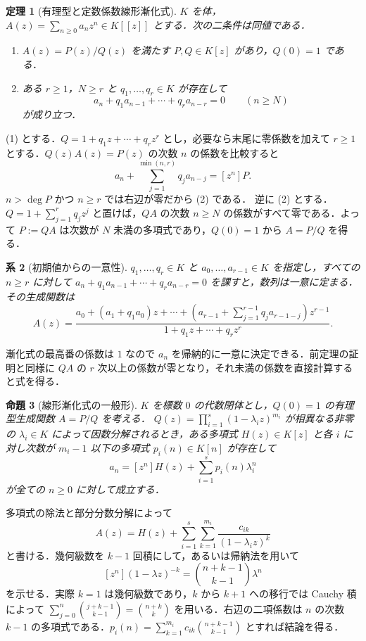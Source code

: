 \documentclass[a5paper,10pt,onecolumn]{jsarticle}
\makeatletter
\theoremstyle{mathnotetheorem}
\newtheorem{theorem}{定理}[section]
\newtheorem{proposition}[theorem]{命題}
\newtheorem{corollary}[theorem]{系}
\renewcommand{\proofname}{証明}
\renewenvironment{proof}[1][\proofname]{%
  \par\pushQED{\qed}\normalfont\topsep4\p@\@plus2\p@\relax
  \trivlist\item[\hskip\labelsep\bfseries #1]\ignorespaces
}{\popQED\endtrivlist\@endpefalse}
\makeatother
\begin{document}
\begin{theorem}[有理型と定数係数線形漸化式]\label{thm:rational}
$K$ を体，$A(z)=\sum_{n\ge0}a_nz^n\in K[[z]]$ とする．次の二条件は同値である．
\begin{enumerate}
\item $A(z)=P(z)/Q(z)$ を満たす $P,Q\in K[z]$ があり，$Q(0)=1$ である．
\item ある $r\ge1$，$N\ge r$ と $q_1,\dots,q_r\in K$ が存在して
\[
 a_n+q_1a_{n-1}+\cdots+q_ra_{n-r}=0\qquad(n\ge N)
\]
が成り立つ．
\end{enumerate}
\end{theorem}
\begin{proof}
(1) とする．$Q=1+q_1z+\cdots+q_rz^r$ とし，必要なら末尾に零係数を加えて $r\ge1$ とする．$Q(z)A(z)=P(z)$ の次数 $n$ の係数を比較すると
\[
 a_n+\sum_{j=1}^{\min(n,r)}q_ja_{n-j}=[z^n]P.
\]
$n>\deg P$ かつ $n\ge r$ では右辺が零だから (2) である．
逆に (2) とする．$Q=1+\sum_{j=1}^r q_jz^j$ と置けば，$QA$ の次数 $n\ge N$ の係数がすべて零である．よって $P:=QA$ は次数が $N$ 未満の多項式であり，$Q(0)=1$ から $A=P/Q$ を得る．
\end{proof}

\begin{corollary}[初期値からの一意性]
$q_1,\dots,q_r\in K$ と $a_0,\dots,a_{r-1}\in K$ を指定し，すべての $n\ge r$ に対して
$a_n+q_1a_{n-1}+\cdots+q_ra_{n-r}=0$ を課すと，数列は一意に定まる．その生成関数は
\[
 A(z)=\frac{a_0+(a_1+q_1a_0)z+\cdots+
 (a_{r-1}+\sum_{j=1}^{r-1}q_ja_{r-1-j})z^{r-1}}
 {1+q_1z+\cdots+q_rz^r}.
\]
\end{corollary}
\begin{proof}
漸化式の最高番の係数は $1$ なので $a_n$ を帰納的に一意に決定できる．前定理の証明と同様に $QA$ の $r$ 次以上の係数が零となり，それ未満の係数を直接計算すると式を得る．
\end{proof}

\begin{proposition}[線形漸化式の一般形]\label{prop:partial}
$K$ を標数 $0$ の代数閉体とし，$Q(0)=1$ の有理型生成関数 $A=P/Q$ を考える．
$Q(z)=\prod_{i=1}^{s}(1-\lambda_i z)^{m_i}$ が相異なる非零の $\lambda_i\in K$ によって因数分解されるとき，ある多項式 $H(z)\in K[z]$ と各 $i$ に対し次数が $m_i-1$ 以下の多項式 $p_i(n)\in K[n]$ が存在して
\[
 a_n=[z^n]H(z)+\sum_{i=1}^s p_i(n)\lambda_i^n
\]
が全ての $n\ge0$ に対して成立する．
\end{proposition}
\begin{proof}
多項式の除法と部分分数分解によって
\[
 A(z)=H(z)+\sum_{i=1}^s\sum_{k=1}^{m_i}
 \frac{c_{ik}}{(1-\lambda_i z)^k}
\]
と書ける．幾何級数を $k-1$ 回積にして，あるいは帰納法を用いて
\[
 [z^n](1-\lambda z)^{-k}=
 \binom{n+k-1}{k-1}\lambda^n
\]
を示せる．実際 $k=1$ は幾何級数であり，$k$ から $k+1$ への移行では Cauchy 積によって
$\sum_{j=0}^n\binom{j+k-1}{k-1}=\binom{n+k}{k}$ を用いる．右辺の二項係数は $n$ の次数 $k-1$ の多項式である．$p_i(n)=\sum_{k=1}^{m_i}c_{ik}\binom{n+k-1}{k-1}$ とすれば結論を得る．
\end{proof}
\end{document}
